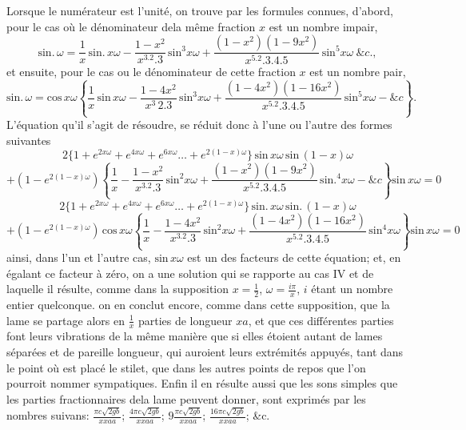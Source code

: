 \documentclass[11pt,a4paper]{article}
\begin{document}
Lorsque le numérateur est l'unité, on trouve par les formules connues, d'abord,
pour le cas où le dénominateur dela même fraction $x$ est un nombre impair,
\[ \text{sin.}\,\omega = \frac{1}{x}\,\text{sin.}\,x\omega - \frac{1-x^2}{x^3.2.3}\,\text{sin}^3 x\omega + \frac{(1-x^2)(1-9x^2)}{x^5.2.3.4.5}\,\text{sin}^5 x\omega\ \&c., \]
et ensuite, pour le cas ou le dénominateur de cette fraction $x$ est un nombre pair,
\[ \text{sin.}\,\omega = \text{cos}\,x\omega\left\{\frac{1}{x}\,\text{sin}\,x\omega - \frac{1-4x^2}{x^3\,2.3}\,\text{sin}^3 x\omega + \frac{(1-4x^2)(1-16x^2)}{x^5.2.3.4.5}\,\text{sin}^5 x\omega - \&c\right\}. \]
L'équation qu'il s'agit de résoudre, se réduit donc à l'une ou l'autre des formes
suivantes
\[ 2\{1 + e^{2x\omega} + e^{4x\omega} + e^{6x\omega} \ldots + e^{2(1-x)\omega}\}\,\text{sin}\,x\omega\,\text{sin}\,(1-x)\omega \]
\[ + (1-e^{2(1-x)\omega})\left\{\frac{1}{x} - \frac{1-x^2}{x^3.2.3}\,\text{sin}^2 x\omega + \frac{(1-x^2)(1-9x^2)}{x^5.2.3.4.5}\,\text{sin.}^4 x\omega - \&c\right\}\text{sin}\,x\omega = 0 \]
\[ 2\{1 + e^{2x\omega} + e^{4x\omega} + e^{6x\omega} \ldots + e^{2(1-x)\omega}\}\,\text{sin.}\,x\omega\,\text{sin.}\,(1-x)\omega \]
\[ + (1-e^{2(1-x)\omega})\,\text{cos}\,x\omega\left\{\frac{1}{x} - \frac{1-4x^2}{x^3.2.3}\,\text{sin}^2 x\omega + \frac{(1-4x^2)(1-16x^2)}{x^5.2.3.4.5}\,\text{sin}^4 x\omega\right\}\text{sin}\,x\omega = 0 \]
ainsi, dans l'un et l'autre cas, $\text{sin}\,x\omega$ est un des facteurs de cette équation; et, en
égalant ce facteur à zéro, on a une solution qui se rapporte au cas IV et de
laquelle il résulte, comme dans la supposition $x = \frac{1}{2}$, $\omega = \frac{i\pi}{x}$, $i$ étant un nombre
entier quelconque. on en conclut encore, comme dans cette supposition, que la
lame se partage alors en $\frac{1}{x}$ parties de longueur $xa$, et que ces différentes
parties font leurs vibrations de la même manière que si elles étoient autant de
lames séparées et de pareille longueur, qui auroient leurs extrémités appuyés, tant
dans le point où est placé le stilet, que dans les autres points de repos que
l'on pourroit nommer sympatiques. Enfin il en résulte aussi que les sons
simples que les parties fractionnaires dela lame peuvent donner, sont exprimés
par les nombres suivans: $\frac{\pi c\sqrt{2gb}}{xxaa}$; $\frac{4\pi c\sqrt{2gb}}{xxaa}$; $9\frac{\pi c\sqrt{2gb}}{xxaa}$; $\frac{16\pi c\sqrt{2gb}}{xxaa}$; \&c.
\end{document}

